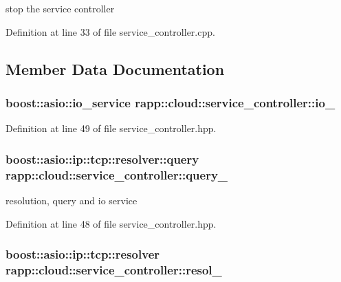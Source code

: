 stop the service controller 



Definition at line 33 of file service\-\_\-controller.\-cpp.



\subsection{Member Data Documentation}
\hypertarget{classrapp_1_1cloud_1_1service__controller_ae75747e5cb7ec35db7413b6a5d8c560d}{
\subsubsection[{io\-\_\-}]{\setlength{\rightskip}{0pt plus 5cm}boost\-::asio\-::io\-\_\-service rapp\-::cloud\-::service\-\_\-controller\-::io\-\_\-\hspace{0.3cm}{\ttfamily [private]}}}\label{classrapp_1_1cloud_1_1service__controller_ae75747e5cb7ec35db7413b6a5d8c560d}


Definition at line 49 of file service\-\_\-controller.\-hpp.

\hypertarget{classrapp_1_1cloud_1_1service__controller_a9f8f7b72c7ca33968f3a549cc1b78458}{
\subsubsection[{query\-\_\-}]{\setlength{\rightskip}{0pt plus 5cm}boost\-::asio\-::ip\-::tcp\-::resolver\-::query rapp\-::cloud\-::service\-\_\-controller\-::query\-\_\-\hspace{0.3cm}{\ttfamily [private]}}}\label{classrapp_1_1cloud_1_1service__controller_a9f8f7b72c7ca33968f3a549cc1b78458}


resolution, query and io service 



Definition at line 48 of file service\-\_\-controller.\-hpp.

\hypertarget{classrapp_1_1cloud_1_1service__controller_ae26bae9aaefaf7ddbd104fd1772afdd3}{
\subsubsection[{resol\-\_\-}]{\setlength{\rightskip}{0pt plus 5cm}boost\-::asio\-::ip\-::tcp\-::resolver rapp\-::cloud\-::service\-\_\-controller\-::resol\-\_\-\hspace{0.3cm}{\ttfamily [private]}}}\label{classrapp_1_1cloud_1_1service__controller_ae26bae9aaefaf7ddbd104fd1772afdd3}


